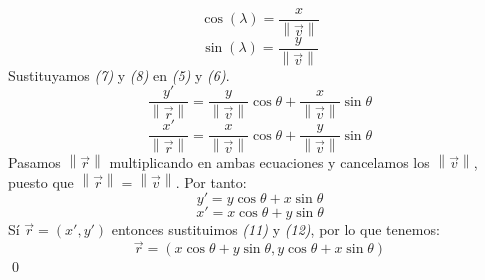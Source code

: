 \documentclass{article}
\begin{document}
\begin{equation}
   \cos(\lambda) = \frac{x}{\left \| \overrightarrow{v} \right \|}
\end{equation}
\begin{equation}
   \sin(\lambda) = \frac{y}{\left \| \overrightarrow{v}\right \|}
\end{equation}
Sustituyamos \textit{(7)} y \textit{(8)} en \textit{(5)} y \textit{(6)}.
\begin{equation}
   \frac{y'}{ \left \| \overrightarrow{r} \right \|} =  \frac{y}{\left \| \overrightarrow{v}\right \|}\cos{\theta}+\frac{x}{\left \| \overrightarrow{v} \right \|}\sin{\theta}
\end{equation}
\begin{equation}
   \frac{x'}{ \left \| \overrightarrow{r} \right \|} =  \frac{x}{\left \| \overrightarrow{v} \right \|}\cos{\theta}+\frac{y}{\left \| \overrightarrow{v}\right \|}\sin{\theta}
\end{equation}
Pasamos \begin{math}
\left \| \overrightarrow{r} \right \|
\end{math} multiplicando en ambas ecuaciones y cancelamos los \begin{math}
\left \| \overrightarrow{v} \right \|
\end{math}, puesto que \begin{math} \left \| \overrightarrow{r} \right \| = \left \| \overrightarrow{v} \right \| \end{math}. Por tanto:
 \begin{equation}
   y'=  y\cos{\theta}+x\sin{\theta}
\end{equation}
\begin{equation}
   x'=  x\cos{\theta}+y\sin{\theta}
\end{equation}
Sí \begin{math}
\overrightarrow{r} = (x',y')
\end{math} entonces sustituimos \textit{(11)} y \textit{(12)}, por lo que tenemos:
 \begin{equation}
   \overrightarrow{r}=( x\cos{\theta}+y\sin{\theta},y\cos{\theta}+x\sin{\theta})
\end{equation}
\qed
\end{document}
